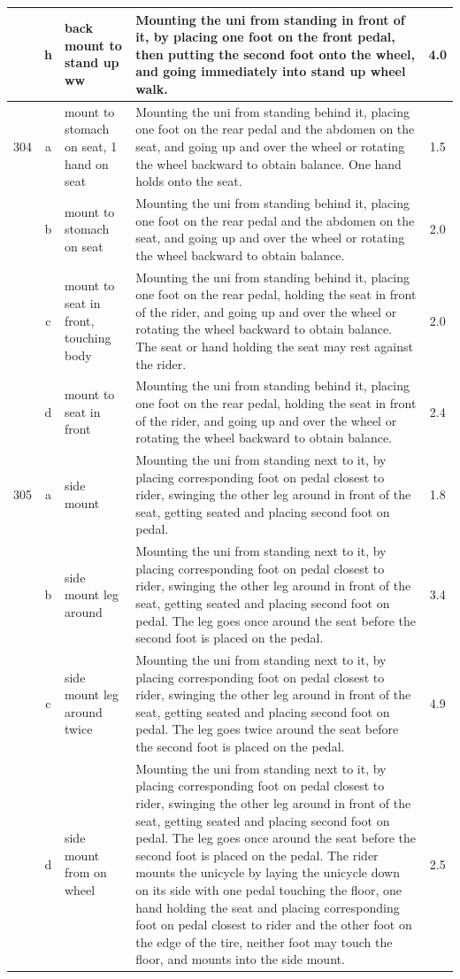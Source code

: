 \begin{longtable}{|r|c|p{4cm}|p{8cm}|c|}
\hline
  & h & back mount to stand up ww & Mounting the uni from standing in front of it, by placing one foot on the front pedal, then putting the second foot onto the wheel, and going immediately into stand up wheel walk. & 4.0 \\ 
\hline
304 & a & mount to stomach on seat, 1 hand on seat  & Mounting the uni from standing behind it, placing one foot on the rear pedal and the abdomen on the seat, and going up and over the wheel or rotating the wheel backward to obtain balance. One hand holds onto the seat. & 1.5 \\ 
\hline
  & b & mount to stomach on seat  & Mounting the uni from standing behind it, placing one foot on the rear pedal and the abdomen on the seat, and going up and over the wheel or rotating the wheel backward to obtain balance. & 2.0 \\ 
\hline
  & c & mount to seat in front, touching body & Mounting the uni from standing behind it, placing one foot on the rear pedal, holding the seat in front of the rider, and going up and over the wheel or rotating the wheel backward to obtain balance. The seat or hand holding the seat may rest against the rider. & 2.0 \\ 
\hline
  & d & mount to seat in front  & Mounting the uni from standing behind it, placing one foot on the rear pedal, holding the seat in front of the rider, and going up and over the wheel or rotating the wheel backward to obtain balance. & 2.4 \\ 
\hline
305 & a & side mount  & Mounting the uni from standing next to it, by placing corresponding foot on pedal closest to rider, swinging the other leg around in front of the seat, getting seated and placing second foot on pedal.  & 1.8 \\ 
\hline
  & b & side mount leg around & Mounting the uni from standing next to it, by placing corresponding foot on pedal closest to rider, swinging the other leg around in front of the seat, getting seated and placing second foot on pedal. The leg goes once around the seat before the second foot is placed on the pedal. & 3.4 \\ 
\hline
  & c & side mount leg around twice & Mounting the uni from standing next to it, by placing corresponding foot on pedal closest to rider, swinging the other leg around in front of the seat, getting seated and placing second foot on pedal. The leg goes twice around the seat before the second foot is placed on the pedal.  & 4.9 \\ 
\hline
  & d & side mount from on wheel  & Mounting the uni from standing next to it, by placing corresponding foot on pedal closest to rider, swinging the other leg around in front of the seat, getting seated and placing second foot on pedal. The leg goes once around the seat before the second foot is placed on the pedal. The rider mounts the unicycle by laying the unicycle down on its side with one pedal touching the floor, one hand holding the seat and placing corresponding foot on pedal closest to rider and the other foot on the edge of the tire, neither foot may touch the floor, and mounts into the side mount. & 2.5 \\ 

\end{longtable}

